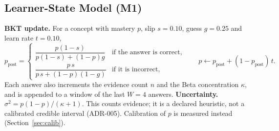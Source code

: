 \documentclass[english]{sintr}
\begin{document}
\subsection{Learner-State Model (M1)}
\label{sec:state}
\textbf{BKT update.} For a concept with mastery $p$, slip $s = 0.10$, guess $g = 0.25$ and learn rate $t = 0.10$,
\begin{equation*}
p_{\text{post}} =
\begin{cases}
\dfrac{p(1-s)}{p(1-s) + (1-p)g} & \text{if the answer is correct,}\\[2ex]
\dfrac{p\,s}{p\,s + (1-p)(1-g)} & \text{if it is incorrect,}
\end{cases}
\qquad
p \leftarrow p_{\text{post}} + (1-p_{\text{post}})\,t .
\end{equation*}
Each answer also increments the evidence count $n$ and the Beta concentration $\kappa$, and is appended to a window of the last $W=4$ answers.
\vspace{0.2em}\newline
\textbf{Uncertainty.} $\sigma^2 = p(1-p)/(\kappa+1)$. This counts evidence; it is a declared heuristic, not a calibrated credible interval (ADR-005). Calibration of $p$ is measured instead (Section~\ref{sec:calib}).
\end{document}
